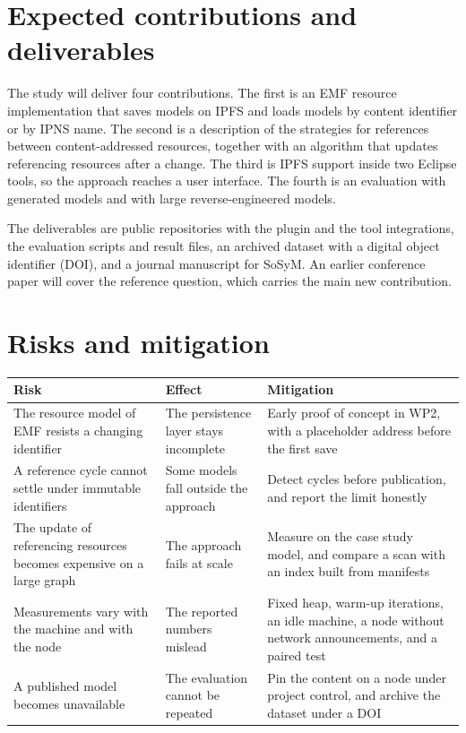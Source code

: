 \documentclass[11pt,a4paper]{article}
\begin{document}
\section{Expected contributions and deliverables}

The study will deliver four contributions. The first is an EMF resource implementation that saves models on IPFS and loads models by content identifier or by IPNS name. The second is a description of the strategies for references between content-addressed resources, together with an algorithm that updates referencing resources after a change. The third is IPFS support inside two Eclipse tools, so the approach reaches a user interface. The fourth is an evaluation with generated models and with large reverse-engineered models.

The deliverables are public repositories with the plugin and the tool integrations, the evaluation scripts and result files, an archived dataset with a digital object identifier (DOI), and a journal manuscript for SoSyM. An earlier conference paper will cover the reference question, which carries the main new contribution.

\section{Risks and mitigation}

\begin{center}
\begin{tabular}{@{}p{50mm}p{44mm}p{55mm}@{}}
\toprule
Risk & Effect & Mitigation \\
\midrule
The resource model of EMF resists a changing identifier & The persistence layer stays incomplete & Early proof of concept in WP2, with a placeholder address before the first save \\
A reference cycle cannot settle under immutable identifiers & Some models fall outside the approach & Detect cycles before publication, and report the limit honestly \\
The update of referencing resources becomes expensive on a large graph & The approach fails at scale & Measure on the case study model, and compare a scan with an index built from manifests \\
Measurements vary with the machine and with the node & The reported numbers mislead & Fixed heap, warm-up iterations, an idle machine, a node without network announcements, and a paired test \\
A published model becomes unavailable & The evaluation cannot be repeated & Pin the content on a node under project control, and archive the dataset under a DOI \\
\bottomrule
\end{tabular}
\end{center}
\end{document}
